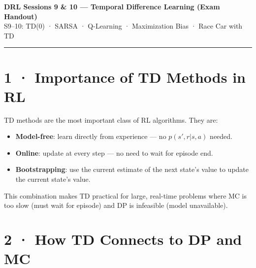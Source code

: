 \documentclass[11pt,a4paper]{article}
\begin{document}
\begin{center}
  {\large\bfseries DRL Sessions 9 \& 10 — Temporal Difference Learning (Exam Handout)}\\[2pt]
  {\small S9--10: TD(0) · SARSA · Q-Learning · Maximization Bias · Race Car with TD}
\end{center}
\hrule\vspace{6pt}

\section*{1 · Importance of TD Methods in RL}

\begin{tcolorbox}[defn={Why TD is Central to RL}]
TD methods are the most important class of RL algorithms. They are:
\begin{itemize}
  \item \textbf{Model-free}: learn directly from experience — no $p(s',r|s,a)$ needed.
  \item \textbf{Online}: update at every step — no need to wait for episode end.
  \item \textbf{Bootstrapping}: use the current estimate of the next state's value to update
    the current state's value.
\end{itemize}
This combination makes TD practical for large, real-time problems where MC is too slow
(must wait for episode) and DP is infeasible (model unavailable).
\end{tcolorbox}

\section*{2 · How TD Connects to DP and MC}
\end{document}
